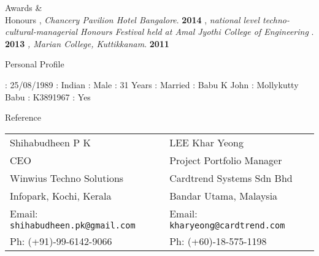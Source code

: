 \documentclass{resume}
\begin{document}

\begin{category}{Awards \&\\ Honours}
  , {\em
    Chancery Pavilion Hotel Bangalore}. \hfill \textbf{2014}
  , {\em national level techno-cultural-managerial Honours Festival held at Amal Jyothi College of Engineering }. \hfill \textbf{2013}
   {\em , Marian College, Kuttikkanam}. \hfill \textbf{2011}
\end{category}


\begin{category}{Personal Profile}
 
           :   25/08/1989 
             :   Indian 
                  :   Male 
                     :   31 Years 
          :   Married 
           :   Babu K John 
           :   Mollykutty Babu 
         :   K3891967
     :   Yes
\end{category}




\begin{category}{Reference}
  \citemnobullet \\
  \begin{tabular}{ll}Shihabudheen P K& LEE Khar Yeong\\
    CEO& Project Portfolio Manager\\
    Winwius Techno Solutions&Cardtrend Systems Sdn Bhd\\
    Infopark, Kochi, Kerala& Bandar Utama, Malaysia\\
    Email: \mbox{\small\tt shihabudheen.pk@gmail.com}&Email: \mbox{\small\tt kharyeong@cardtrend.com}\\
    Ph: (+91)-99-6142-9066&Ph: (+60)-18-575-1198
  \end{tabular}
\end{category}
\end{document}

